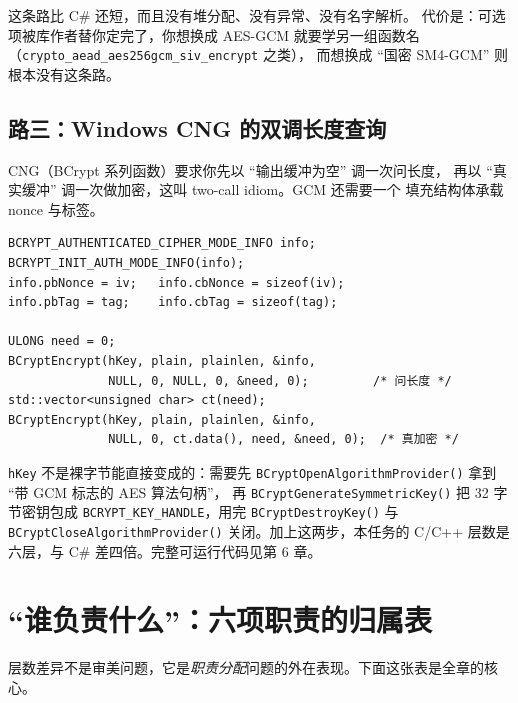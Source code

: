 \documentclass[12pt,a4paper,fontset=fandol]{ctexbook}
\newcommand{\Fn}[1]{\texttt{#1()}}
\newcommand{\Tp}[1]{\texttt{#1}}
\newcommand{\CSharp}{C\#}
\newcommand{\CppJava}{C/C++}
\begin{document}
这条路比 \CSharp{} 还短，而且没有堆分配、没有异常、没有名字解析。
代价是：可选项被库作者替你定完了，你想换成 AES-GCM 就要学另一组函数名
（\texttt{crypto\_\allowbreak{}aead\_\allowbreak{}aes256gcm\_\allowbreak{}siv\_\allowbreak{}encrypt} 之类），
而想换成 ``国密 SM4-GCM'' 则根本没有这条路。

\subsection{路三：Windows CNG 的双调长度查询}

CNG（BCrypt 系列函数）要求你先以 ``输出缓冲为空'' 调一次问长度，
再以 ``真实缓冲'' 调一次做加密，这叫 two-call idiom。GCM 还需要一个
填充结构体承载 nonce 与标签。

\begin{lstlisting}[caption={C/C++ 路三：CNG 的两次调用模式}]
BCRYPT_AUTHENTICATED_CIPHER_MODE_INFO info;
BCRYPT_INIT_AUTH_MODE_INFO(info);
info.pbNonce = iv;   info.cbNonce = sizeof(iv);
info.pbTag = tag;    info.cbTag = sizeof(tag);

ULONG need = 0;
BCryptEncrypt(hKey, plain, plainlen, &info,
              NULL, 0, NULL, 0, &need, 0);         /* 问长度 */
std::vector<unsigned char> ct(need);
BCryptEncrypt(hKey, plain, plainlen, &info,
              NULL, 0, ct.data(), need, &need, 0);  /* 真加密 */
\end{lstlisting}

\begin{note}[title=这段代码省略了什么]
\Tp{hKey} 不是裸字节能直接变成的：需要先
\Fn{BCrypt\allowbreak{}Open\allowbreak{}Algorithm\allowbreak{}Provider} 拿到 ``带 GCM 标志的 AES 算法句柄''，
再 \Fn{BCrypt\allowbreak{}Generate\allowbreak{}Symmetric\allowbreak{}Key} 把 32 字节密钥包成
\Tp{BCRYPT\_\allowbreak{}KEY\_\allowbreak{}HANDLE}，用完 \Fn{BCrypt\allowbreak{}Destroy\allowbreak{}Key} 与
\Fn{BCrypt\allowbreak{}Close\allowbreak{}Algorithm\allowbreak{}Provider} 关闭。加上这两步，本任务的
\CppJava{} 层数是六层，与 \CSharp{} 差四倍。完整可运行代码见第 6 章。
\end{note}

\section{``谁负责什么''：六项职责的归属表}

层数差异不是审美问题，它是\emph{职责分配}问题的外在表现。下面这张表是全章的核心。
\end{document}
